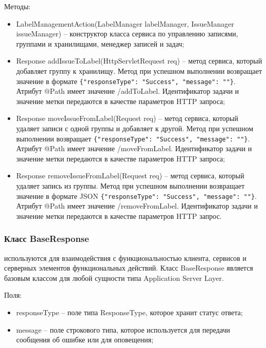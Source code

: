 Методы:
\begin{itemize}
  \item LabelManagementAction(LabelManager labelManager, IssueManager \\issueManager) – конструктор класса сервиса по управлению записями, группами и хранилищами, менеджер записей и задач;
  \item Response addIssueToLabel(HttpServletRequest req) – метод сервиса, который добавляет группу к хранилищу. Метод при успешном выполнении возвращает значение в формате \lstinline!{"responseType": "Success", "message": ""}!.\\ Атрибут @Path имеет значение /addToLabel. Идентификатор задачи и значение метки передаются в качестве параметров HTTP запроса;
  \item Response moveIssueFromLabel(Request req) – метод сервиса, который удаляет записи с одной группы и добавляет к другой. Метод при успешном выполнении возвращает \lstinline!{"responseType": "Success", "message": ""}!. Атрибут @Path имеет значение /moveFromLabel. Идентификатор задачи и значение метки передаются в качестве параметров HTTP запроса;
  \item Response removeIssueFromLabel(Request req) – метод сервиса, который удаляет запись из группы. Метод при успешном выполнении возвращает значение в формате JSON \lstinline!{"responseType": "Success", "message": ""}!. Атрибут @Path имеет значение /removeFromLabel. Идентификатор задачи и значение метки передаются в качестве параметров HTTP запрос.
\end{itemize}

\subsubsection{Класс BaseResponse }
\label{sub:arch_and_mod:application_server_layer:base_response}

используются для взаимодействия с функциональностью клиента, сервисов и серверных элементов функциональных действий. Класс BaseResponse является базовым классом для любой сущности типа Application Server Layer.

Поля:
\begin{itemize}
  \item responseType – поле типа ResponseType, которое хранит статус ответа;
  \item message – поле строкового типа, которое используется для передачи сообщения об ошибке или для оповещения;
\end{itemize}

